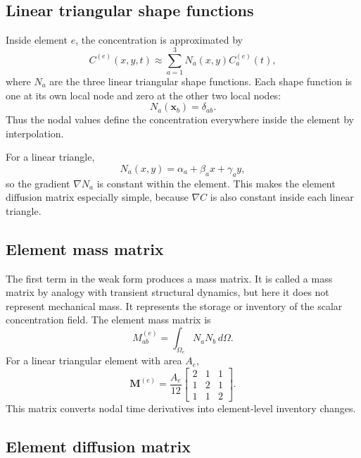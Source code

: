 \documentclass[11pt]{article}
\renewcommand{\xvec}{\mathbf{x}}
\begin{document}
\subsection{Linear triangular shape functions}

Inside element $e$, the concentration is approximated by
\begin{equation}
C^{(e)}(x,y,t)
\approx
\sum_{a=1}^{3}N_a(x,y)C_a^{(e)}(t),
\end{equation}
where $N_a$ are the three linear triangular shape functions. Each shape function is one at its own local node and zero at the other two local nodes:
\begin{equation}
N_a(\xvec_b)=\delta_{ab}.
\end{equation}
Thus the nodal values define the concentration everywhere inside the element by interpolation.

For a linear triangle,
\begin{equation}
N_a(x,y)=\alpha_a+\beta_a x+\gamma_a y,
\end{equation}
so the gradient $\nabla N_a$ is constant within the element. This makes the element diffusion matrix especially simple, because $\nabla C$ is also constant inside each linear triangle.

\subsection{Element mass matrix}

The first term in the weak form produces a mass matrix. It is called a mass matrix by analogy with transient structural dynamics, but here it does not represent mechanical mass. It represents the storage or inventory of the scalar concentration field. The element mass matrix is
\begin{equation}
M_{ab}^{(e)}=\int_{\Omega_e}N_aN_b\,d\Omega.
\end{equation}
For a linear triangular element with area $A_e$,
\begin{equation}
\bm{M}^{(e)}=
\frac{A_e}{12}
\begin{bmatrix}
2 & 1 & 1 \\
1 & 2 & 1 \\
1 & 1 & 2
\end{bmatrix}.
\end{equation}
This matrix converts nodal time derivatives into element-level inventory changes.

\subsection{Element diffusion matrix}
\end{document}
